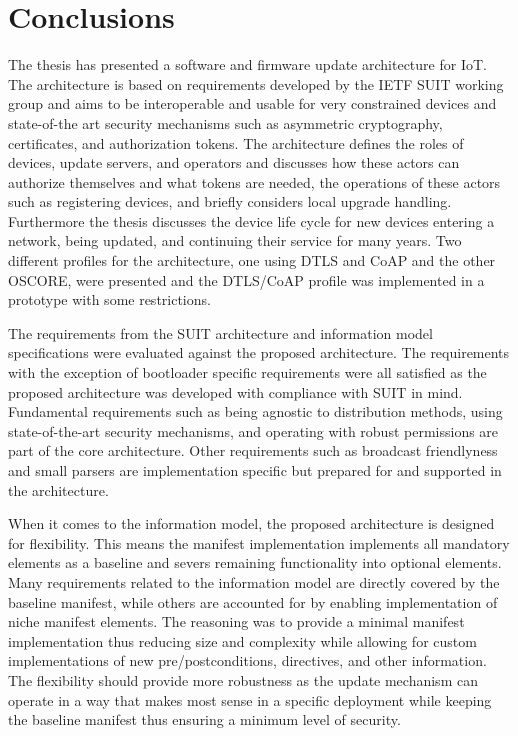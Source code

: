 \documentclass[0-thesis.tex]{subfiles}
\begin{document}

\section{Conclusions}
\label{sec:Conclusions}
The thesis has presented a software and firmware update architecture for IoT. The
architecture is based on requirements developed by the IETF SUIT working group and aims to
be interoperable and usable for very constrained devices and state-of-the art security
mechanisms such as asymmetric cryptography, certificates, and authorization tokens. The
architecture defines the roles of devices, update servers, and operators and discusses how
these actors can authorize themselves and what tokens are needed, the operations of these
actors such as registering devices, and briefly considers local upgrade handling.
Furthermore the thesis discusses the device life cycle for new devices entering a network,
being updated, and continuing their service for many years. Two different profiles for the
architecture, one using DTLS and CoAP and the other OSCORE, were presented and the
DTLS/CoAP profile was implemented in a prototype with some restrictions.

The requirements from the SUIT architecture and information model specifications were
evaluated against the proposed architecture. The requirements with the exception of
bootloader specific requirements were all satisfied as the proposed architecture was
developed with compliance with SUIT in mind. Fundamental requirements such as being
agnostic to distribution methods, using state-of-the-art security mechanisms, and
operating with robust permissions are part of the core architecture. Other requirements
such as broadcast friendlyness and small parsers are implementation specific but prepared
for and supported in the architecture.

When it comes to the information model, the proposed architecture is designed for
flexibility. This means the manifest implementation implements all mandatory elements as a
baseline and severs remaining functionality into optional elements. Many requirements
related to the information model are directly covered by the baseline manifest, while
others are accounted for by enabling implementation of niche manifest elements. The
reasoning was to provide a minimal manifest implementation thus reducing size and
complexity while allowing for custom implementations of new pre/postconditions,
directives, and other information. The flexibility should provide more robustness as the
update mechanism can operate in a way that makes most sense in a specific deployment while
keeping the baseline manifest thus ensuring a minimum level of security. 
\end{document}
